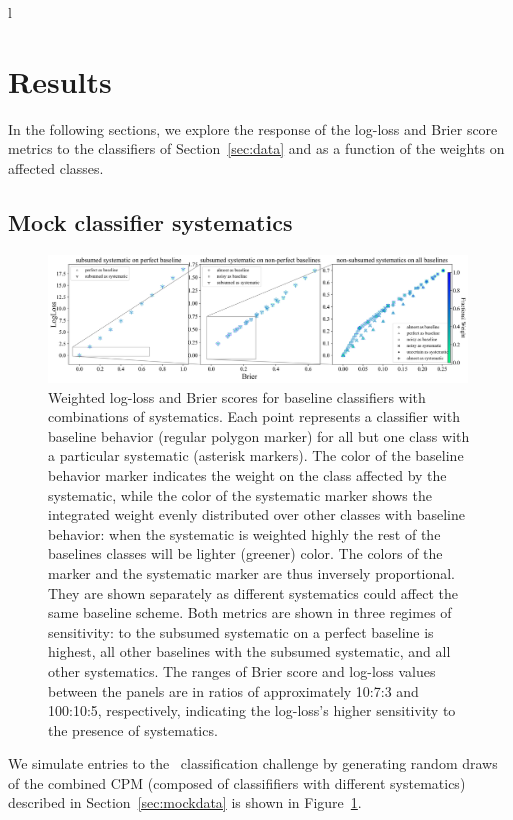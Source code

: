 l\section{Results}
\label{sec:results}

In the following sections, we explore the response of the log-loss and Brier score metrics to the classifiers of Section~\ref{sec:data} and as a function of the weights on affected classes.

\subsection{Mock classifier systematics}
\label{sec:mockresults}

\begin{figure}
	\begin{center}
		\includegraphics[width=0.99\textwidth]{./fig/multipanel_res.png}
		\caption{Weighted log-loss and Brier scores for baseline classifiers with combinations of systematics.
		Each point represents a classifier with baseline behavior (regular polygon marker) for all but one class with a particular systematic (asterisk markers).
		The color of the baseline behavior marker indicates the weight on the class affected by the systematic, while the color of the systematic marker shows the integrated weight evenly distributed over other classes with baseline behavior: when the systematic is weighted highly the rest of the baselines classes will be lighter (greener) color. The colors of the marker and the systematic marker are thus inversely proportional. They are shown separately as different systematics could affect the same baseline scheme.
		Both metrics are shown in three regimes of sensitivity: to the subsumed systematic on a perfect baseline is highest, all other baselines with the subsumed systematic, and all other systematics.
		The ranges of Brier score and log-loss values between the panels are in ratios of approximately 10:7:3 and 100:10:5, respectively, indicating the log-loss's higher sensitivity to the presence of systematics.
		}
	\end{center}
	\label{fig:all_combined}
\end{figure}
We simulate entries to the \plasticc\ classification challenge by generating random draws of the combined CPM (composed of classififiers with different systematics) described in Section~\ref{sec:mockdata} is shown in Figure~\ref{fig:all_combined}.

